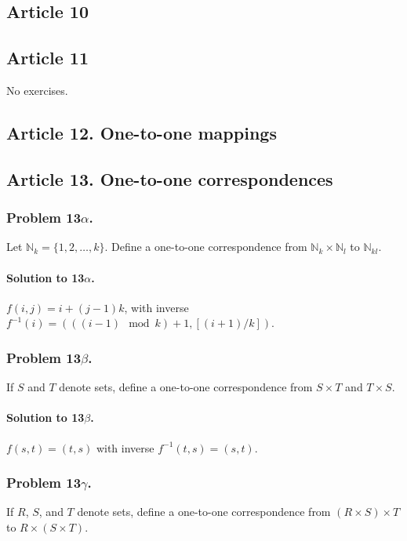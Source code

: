 \subsection{Article 10}

\subsection{Article 11}

No exercises.

\subsection{Article 12. One-to-one mappings}

\subsection{Article 13. One-to-one correspondences}
\subsubsection{Problem 13$\alpha$.}
Let $\mathbb{N}_k = \{ 1, 2, \dots, k \}$. Define a one-to-one correspondence
from $\mathbb{N}_k \times \mathbb{N}_l$ to $\mathbb{N}_{kl}$.

\paragraph*{Solution to 13$\alpha$.}
$f(i,j) = i + (j-1)k$, with inverse $f^{-1}(i) = (((i-1) \mod k)+1,
[(i+1)/k])$.

\subsubsection{Problem 13$\beta$.}
If $S$ and $T$ denote sets, define a one-to-one correspondence from $S \times T$
and $T \times S$.

\paragraph*{Solution to 13$\beta$.}
$f (s, t) = (t, s)$ with inverse $f^{-1}(t, s) = (s,t)$.

\subsubsection{Problem 13$\gamma$.}
If $R$, $S$, and $T$ denote sets, define a one-to-one correspondence from
$(R \times S) \times T$ to $R \times (S \times T)$.

